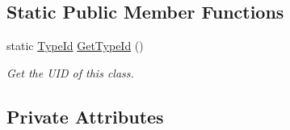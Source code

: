 \subsection*{Static Public Member Functions}
\begin{DoxyCompactItemize}
\item 
static \hyperlink{classns3_1_1TypeId}{Type\+Id} \hyperlink{classns3_1_1Icmpv6RA_a71190d34d89f3a90ea3d6fb127ad8aea}{Get\+Type\+Id} ()
\begin{DoxyCompactList}\small\item\em Get the U\+ID of this class. \end{DoxyCompactList}\end{DoxyCompactItemize}
\subsection*{Private Attributes}
